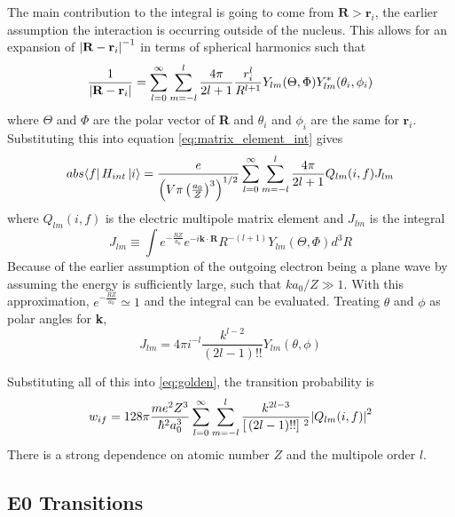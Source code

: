 The main contribution to the integral is going to come from $\textbf{R}>\textbf{r}_i$, the earlier assumption the interaction is occurring outside of the nucleus. This allows for an expansion of $\abs{\textbf{R}-\textbf{r}_i}^{-1}$ in terms of spherical harmonics such that
\begin{equation}
\label{eq:expansion_Rri}
    \frac{1}{\abs{\textbf{R}-\textbf{r}_i}} = \sum_{l=0}^\infty\sum_{m=-l}^{l}\frac{4\pi}{2l+1}\frac{r_i^l}{R^{l+1}}Y_{lm}(\Theta,\Phi)Y_{lm}^{*}(\theta_i,\phi_i)
\end{equation}
where $\Theta$ and $\Phi$ are the polar vector of \textbf{R} and $\theta_i$ and $\phi_i$ are the same for $\textbf{r}_i$. Substituting this into equation \ref{eq:matrix_element_int} gives
\begin{equation}
    
    abs{\bra{f}H_{int}\ket{i}} = \frac{e}{ \left(V\pi\left(\frac{a_0}{Z}\right)^3\right)^{1/2}} \sum_{l=0}^\infty\sum_{m=-l}^{l}\frac{4\pi}{2l+1} Q_{lm}(i,f)J_{lm}
\end{equation}
where $Q_{lm}(i,f)$ is the electric multipole matrix element and $J_{lm}$ is the integral
\begin{equation}
    J_{lm}\equiv\int e^{-\frac{RZ}{a_0}}e^{-i\textbf{k}\cdot\textbf{R}}R^{-(l+1)}Y_{lm}(\Theta,\Phi)d^3R
\end{equation}
Because of the earlier assumption of the outgoing electron being a plane wave by assuming the energy is sufficiently large, such that $ka_0/Z\gg1$. With this approximation, $e^{-\frac{RZ}{a_0}}\simeq1$ and the integral can be evaluated. Treating $\theta$ and $\phi$ as polar angles for \textbf{k}, 
\begin{equation}
    J_{lm}=4\pi i^{-l}\frac{k^{l-2}}{(2l-1)!!}Y_{lm}(\theta,\phi)
\end{equation}

Substituting all of this into \ref{eq:golden}, the transition probability is
\begin{equation}
    w_{if}=128\pi\frac{me^2Z^3}{\hbar^2a_0^3} \sum_{l=0}^\infty\sum_{m=-l}^{l} \frac{k^{2l-3}}{\left[\,(2l-1)!!\right]\,^2}\abs{Q_{lm}(i,f)}^2
\end{equation}
There is a strong dependence on atomic number $Z$ and the multipole order $l$. 

\subsection{E0 Transitions}
\label{sec:E0}

